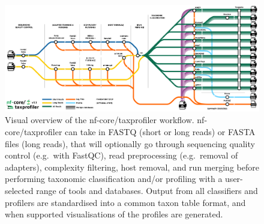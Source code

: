 \documentclass[
]{article}
\begin{document}
\begin{figure}

{\centering \includegraphics{taxprofiler_tube.png}

}

\caption{\label{fig-workflow-diagram}Visual overview of the
nf-core/taxprofiler workflow. nf-core/taxprofiler can take in FASTQ
(short or long reads) or FASTA files (long reads), that will optionally
go through sequencing quality control (e.g.~with FastQC), read
preprocessing (e.g.~removal of adapters), complexity filtering, host
removal, and run merging before performing taxonomic classification
and/or profiling with a user-selected range of tools and databases.
Output from all classifiers and profilers are standardised into a common
taxon table format, and when supported visualisations of the profiles
are generated.}

\end{figure}
\end{document}

